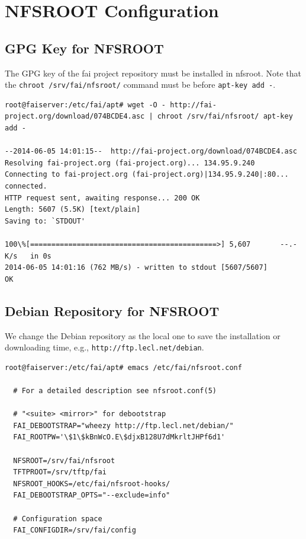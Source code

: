 \documentclass[11pt
  , a4paper
  , article
  , oneside
]{memoir}
\begin{document}
\section{NFSROOT Configuration}

\subsection{GPG Key for NFSROOT}
The GPG key of the fai project repository must be installed in nfsroot. Note that the \texttt{chroot /srv/fai/nfsroot/} command must be before \texttt{apt-key add -}.
\begin{lstlisting}
root@faiserver:/etc/fai/apt# wget -O - http://fai-project.org/download/074BCDE4.asc | chroot /srv/fai/nfsroot/ apt-key add -

--2014-06-05 14:01:15--  http://fai-project.org/download/074BCDE4.asc
Resolving fai-project.org (fai-project.org)... 134.95.9.240
Connecting to fai-project.org (fai-project.org)|134.95.9.240|:80... connected.
HTTP request sent, awaiting response... 200 OK
Length: 5607 (5.5K) [text/plain]
Saving to: `STDOUT'

100\%[============================================>] 5,607       --.-K/s   in 0s      
2014-06-05 14:01:16 (762 MB/s) - written to stdout [5607/5607]
OK
\end{lstlisting}

\subsection{Debian Repository for NFSROOT}
We change the Debian repository as the local one  to save the installation or downloading time, e.g., \texttt{http://ftp.lecl.net/debian}. 


\begin{lstlisting}
root@faiserver:/etc/fai/apt# emacs /etc/fai/nfsroot.conf 

  # For a detailed description see nfsroot.conf(5)

  # "<suite> <mirror>" for debootstrap
  FAI_DEBOOTSTRAP="wheezy http://ftp.lecl.net/debian/"
  FAI_ROOTPW='\$1\$kBnWcO.E\$djxB128U7dMkrltJHPf6d1'

  NFSROOT=/srv/fai/nfsroot
  TFTPROOT=/srv/tftp/fai
  NFSROOT_HOOKS=/etc/fai/nfsroot-hooks/
  FAI_DEBOOTSTRAP_OPTS="--exclude=info"

  # Configuration space
  FAI_CONFIGDIR=/srv/fai/config
\end{lstlisting}
\end{document}
